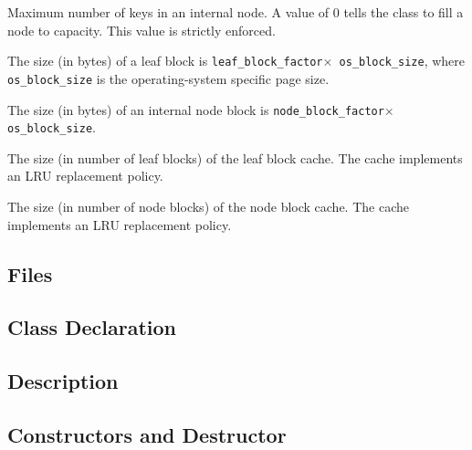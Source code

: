    {Maximum number of keys in an internal
  node. A value of $0$ tells the class to fill a node to capacity. This
  value is strictly enforced.}

   {The size (in bytes) of a leaf block
  is {\tt leaf\_block\_factor$\times$ os\_block\_size}, where {\tt
  os\_block\_size} is the operating-system specific page size.}

   {The size (in bytes) of an internal
  node block is {\tt node\_block\_factor$\times$ os\_block\_size}.}

   {The size (in number of leaf blocks) of
  the leaf block cache. The cache implements an LRU replacement policy.}

   {The size (in number of node blocks) of
  the node block cache. The cache implements an LRU replacement policy.}

\etabb
{}


\subsection{Files}
   \btabb
       {}
   \etabb

\subsection{Class Declaration}
   \btabb
       {}
   \etabb

\subsection{Description}

\subsection{Constructors and Destructor}
   \btabb
   \etabb

